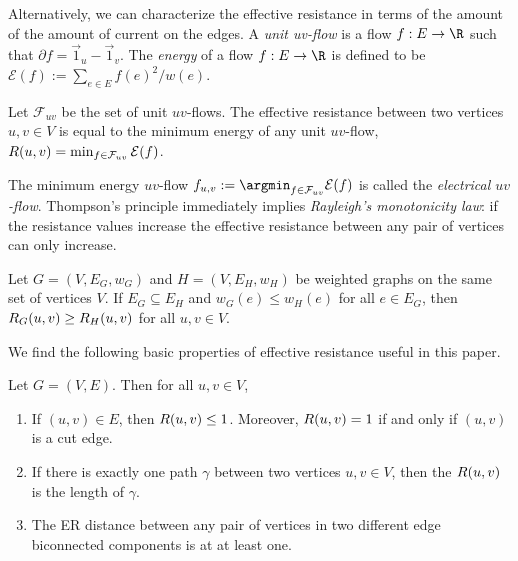 Alternatively, we can characterize the effective resistance in terms of the amount of the amount of current on the edges. A \emph{unit uv-flow} is
a flow $f:E\to\R$ such that $\partial f = \vec{1}_u - \vec{1}_v$. The  \emph{energy} of a flow $f:E\rightarrow \R$ is defined to be %
$\mathcal{E}(f):=\sum_{e\in E}{f(e)^2/w(e)}$. 

\begin{lemma}
\label{lem:thompson_dirichlet}
Let $\mathcal{F}_{uv}$ be the set of unit $uv$-flows. The effective resistance between two vertices $u,v\in V$ is equal to the minimum energy of any unit $uv$-flow, $R(u,v)= \min_{f \in \mathcal{F}_{uv}} \mathcal{E}(f)$.
\end{lemma}
The minimum energy $uv$-flow $f_{u,v}:= \argmin_{f \in \mathcal{F}_{uv}} \mathcal{E}(f)$ is called the \emph{electrical $uv$-flow}.
Thompson's principle immediately implies \emph{Rayleigh's monotonicity law}: if the resistance values increase the effective resistance between any pair of vertices can only increase. 

\begin{lemma}
    Let $G=(V, E_G,w_G)$ and $H=(V, E_H, w_H)$ be weighted graphs on the same set of vertices $V$. If $E_G\subseteq E_H$ and $w_G(e) \leq w_H(e)$ for all $e\in E_G$, then $R_G(u,v) \geq R_H(u,v)$ for all $u,v\in V$. 
\end{lemma}
We find the following basic properties of effective resistance useful in this paper.
\begin{lemma}
\label{lem:er_and_edge_cuts}
Let $G=(V,E)$. Then for all $u, v \in V$,
\begin{enumerate} [(1)]
    \item \label{lem:er_of_an_edge}
    If $(u,v)\in E$, then $R(u,v) \leq 1$.  Moreover, $R(u,v) = 1$ if and only if $(u,v)$ is a cut edge.
    \item \label{lem:er_of_path}
    If there is exactly one path $\gamma$ between two vertices $u,v\in V$, then the $R(u,v)$ is the length of $\gamma$.
    \item The ER distance between any pair of vertices in two different edge biconnected components is at at least one.
\end{enumerate}
\end{lemma}



